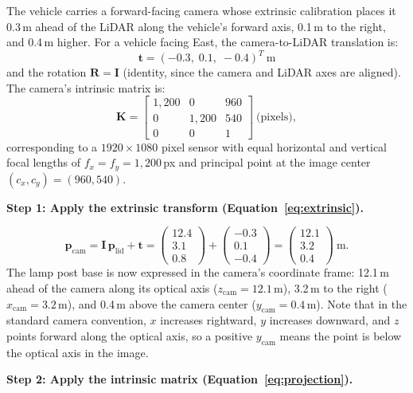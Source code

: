 \documentclass{book}
\begin{document}
The vehicle carries a forward-facing camera whose extrinsic
calibration places it 0.3\,m ahead of the LiDAR along the vehicle's
forward axis, 0.1\,m to the right, and 0.4\,m higher.  For a
vehicle facing East, the camera-to-LiDAR translation is:
\[
  \mathbf{t} = (-0.3,\; 0.1,\; -0.4)^T\ \text{m}
\]
and the rotation $\mathbf{R} = \mathbf{I}$ (identity, since the
camera and LiDAR axes are aligned).  The camera's intrinsic matrix
is:
\[
  \mathbf{K} =
  \begin{bmatrix}
    1{,}200 & 0       & 960 \\
    0       & 1{,}200 & 540 \\
    0       & 0       & 1
  \end{bmatrix}\ \text{(pixels)},
\]
corresponding to a $1920 \times 1080$ pixel sensor with equal
horizontal and vertical focal lengths of $f_x = f_y = 1{,}200$\,px
and principal point at the image center $(c_x, c_y) = (960, 540)$.

\medskip
\noindent\textbf{Step 1: Apply the extrinsic transform
(Equation~\ref{eq:extrinsic}).}

\[
  \mathbf{p}_{\text{cam}}
  = \mathbf{I}\,\mathbf{p}_{\text{lid}} + \mathbf{t}
  = \begin{pmatrix}12.4\\3.1\\0.8\end{pmatrix}
  + \begin{pmatrix}-0.3\\0.1\\-0.4\end{pmatrix}
  = \begin{pmatrix}12.1\\3.2\\0.4\end{pmatrix}\ \text{m}.
\]
The lamp post base is now expressed in the camera's coordinate
frame: 12.1\,m ahead of the camera along its optical axis
($z_{\text{cam}} = 12.1$\,m), 3.2\,m to the right
($x_{\text{cam}} = 3.2$\,m), and 0.4\,m above the camera center
($y_{\text{cam}} = 0.4$\,m).  Note that in the standard camera
convention, $x$ increases rightward, $y$ increases downward, and
$z$ points forward along the optical axis, so a positive
$y_{\text{cam}}$ means the point is below the optical axis in the
image.

\medskip
\noindent\textbf{Step 2: Apply the intrinsic matrix
(Equation~\ref{eq:projection}).}
\end{document}
